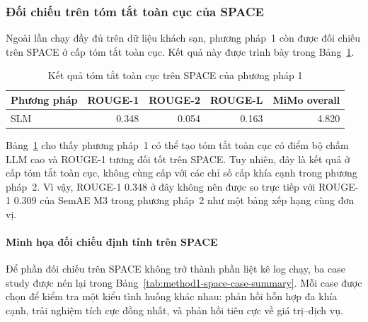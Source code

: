 \subsubsection{Đối chiếu trên tóm tắt toàn cục của SPACE}
\label{subsubsec:method1-space-global}

Ngoài lần chạy đầy đủ trên dữ liệu khách sạn, phương pháp~1 còn được đối chiếu trên SPACE ở cấp
tóm tắt toàn cục. Kết quả này được trình bày trong
Bảng~\ref{tab:method1-space-global}.

\begin{table}[tbp]
\centering
\caption{Kết quả tóm tắt toàn cục trên SPACE của phương pháp 1}
\label{tab:method1-space-global}
\begin{tabular}{l r r r r}
\toprule
\textbf{Phương pháp} & \textbf{ROUGE-1} & \textbf{ROUGE-2} & \textbf{ROUGE-L} & \textbf{MiMo overall} \\
\midrule
SLM & \num{0.348} & \num{0.054} & \num{0.163} & \num{4.820} \\
\bottomrule
\end{tabular}
\end{table}

Bảng~\ref{tab:method1-space-global} cho thấy phương pháp~1 có thể tạo tóm tắt
toàn cục có điểm bộ chấm LLM cao và ROUGE-1 tương đối tốt trên SPACE. Tuy nhiên,
đây là kết quả ở cấp tóm tắt toàn cục, không cùng cấp với các chỉ số
cấp khía cạnh trong phương pháp~2. Vì vậy, ROUGE-1 \num{0.348} ở đây không nên
được so trực tiếp với ROUGE-1 \num{0.309} của SemAE M3 trong phương pháp~2 như một
bảng xếp hạng cùng đơn vị.
\paragraph{Minh họa đối chiếu định tính trên SPACE}

Để phần đối chiếu trên SPACE không trở thành phần liệt kê log chạy, ba case
study được nén lại trong Bảng~\ref{tab:method1-space-case-summary}. Mỗi case
được chọn để kiểm tra một kiểu tình huống khác nhau: phản hồi hỗn hợp đa khía
cạnh, trải nghiệm tích cực đồng nhất, và phản hồi tiêu cực về giá trị--dịch vụ.

